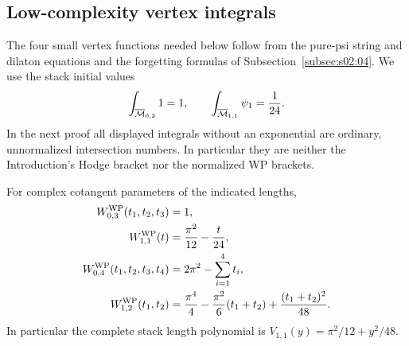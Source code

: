 \subsection{Low-complexity vertex integrals}
\label{subsec:a:03}

The four small vertex functions needed below follow from the pure-psi
string and dilaton equations and the forgetting formulas of
Subsection~\ref{subsec:s02:04}. We use the stack initial values
\[
 \int_{\overline{\mathcal{M}}_{0,3}}1=1,\qquad
 \int_{\overline{\mathcal{M}}_{1,1}}\psi_1=\frac1{24}.
\]
In the next proof all displayed integrals without an exponential are
ordinary, unnormalized intersection numbers. In particular they are
neither the Introduction's Hodge bracket nor the normalized WP brackets.

\begin{lmm}\label{lmm:a:small-vertices}
For complex cotangent parameters of the indicated lengths,
\begin{align}
 W^{\rm WP}_{0,3}(t_1,t_2,t_3)&=1,\notag\\
 W^{\rm WP}_{1,1}(t)&=\frac{\pi^2}{12}-\frac{t}{24},\notag\\
 W^{\rm WP}_{0,4}(t_1,t_2,t_3,t_4)&=2\pi^2-\sum_{i=1}^4t_i,\notag\\
 W^{\rm WP}_{1,2}(t_1,t_2)&=\frac{\pi^4}{4}
       -\frac{\pi^2}{6}(t_1+t_2)+\frac{(t_1+t_2)^2}{48}.
 \label{eq:a:small-vertices}
\end{align}
In particular the complete stack length polynomial is
$V_{1,1}(y)=\pi^2/12+y^2/48$.
\end{lmm}
